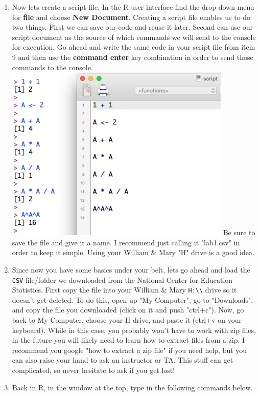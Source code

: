 \documentclass{article}
\newcommand{\code}[1]{\texttt{#1}}
\newcommand{\proglang}[1]{\textsf{#1}}
\begin{document}
{\begin{enumerate}[leftmargin=15mm]
\item Now lets create a script file.  In the R user interface find the drop down menu for \textbf{file} and choose \textbf{New Document}.  Creating a script file enables us to do two things.  First we can save our code and reuse it later.  Second can use our script document as the source of which commands we will send to the console for execution.  Go ahead and write the same code in your script file from item 9 and then use the \textbf{command enter} key combination in order to send those commands to the console. \includegraphics[width=0.85\textwidth]{script.png} Be sure to save the file and give it a name.  I recommend just calling it "lab1.csv" in order to keep it simple.  Using your William \& Mary "H" drive is a good idea.

\item Since now you have some basics under your belt, lets go ahead and load the \code{CSV} file/folder we downloaded from the National Center for Education Statistics.  First copy the file into your William \& Mary \code{H:\textbackslash\textbackslash} drive so it doesn't get deleted.  To do this, open up "My Computer", go to "Downloads", and copy the file you downloaded (click on it and push "ctrl+c").  Now, go back to My Computer, choose your H drive, and paste it (ctrl+v on your keyboard).  While in this case, you probably won't have to work with zip files, in the future you will likely need to learn how to extract files from a zip.  I recommend you google "how to extract a zip file" if you need help, but you can also raise your hand to ask an instructor or TA.  This stuff can get complicated, so never hesitate to ask if you get lost!

\item Back in \proglang{R}, in the window at the top, type in the following commands below.


\end{enumerate}}
\end{document}
